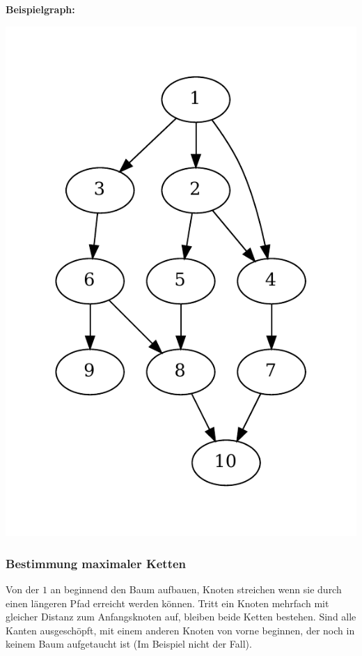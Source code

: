 \textbf{Beispielgraph:}

\begin{center}
\includegraphics[scale=0.7]{images/BeispielgraphGraphentheorie.pdf}
\end{center}

\subsubsection{Bestimmung maximaler Ketten}
Von der $1$ an beginnend den Baum aufbauen, Knoten streichen wenn sie durch einen längeren
Pfad erreicht werden können. Tritt ein Knoten mehrfach mit gleicher Distanz zum Anfangsknoten
auf, bleiben beide Ketten bestehen. Sind alle Kanten ausgeschöpft, mit einem anderen Knoten von
vorne beginnen, der noch in keinem Baum aufgetaucht ist (Im Beispiel nicht der Fall).


